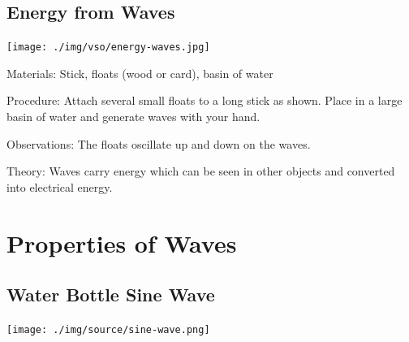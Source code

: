 \begin{multicols}{2}
\subsection{Energy from Waves}

\begin{center}
\texttt{[image: ./img/vso/energy-waves.jpg]}
\end{center}

\begin{description*}
\item[Materials:]{Stick, floats (wood or card), basin of water}
\item[Procedure:]{Attach several small floats to a long stick as shown. Place in a large basin of water and generate waves with your hand.}
\item[Observations:]{The floats oscillate up and down on the waves.}
\item[Theory:]{Waves carry energy which can be seen in other objects and converted into electrical energy.}
\end{description*}

\columnbreak


\section*{Properties of Waves}


\subsection{Water Bottle Sine Wave}

\begin{center}
\texttt{[image: ./img/source/sine-wave.png]}
\end{center}


\end{multicols}
